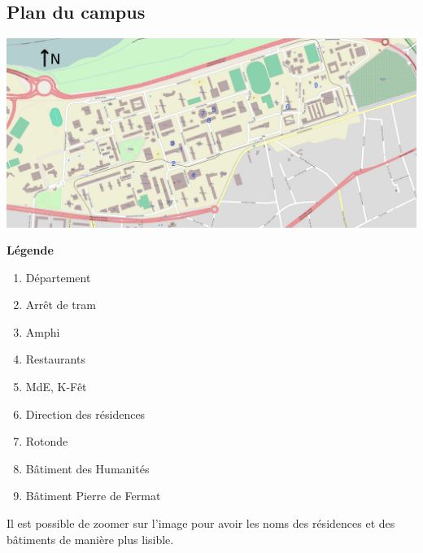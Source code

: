 \subsection{Plan du campus}
\begin{minipage}{0.7\textwidth}
\includegraphics[width=24cm, angle=90]{images/planDoua.jpg}
\end{minipage}
\begin{minipage}{0.3\textwidth}
\textbf{Légende}
    \begin{enumerate}
	\item Département
	\item Arrêt de tram
	\item Amphi
	\item Restaurants
	\item MdE, K-Fêt
	\item Direction des résidences
	\item Rotonde
	\item Bâtiment des Humanités
	\item Bâtiment Pierre de Fermat
    \end{enumerate}
   \vspace{2cm} 
    Il est possible de zoomer sur l'image pour avoir les noms des résidences et
    des bâtiments de manière plus lisible.
\end{minipage}
\newpage

